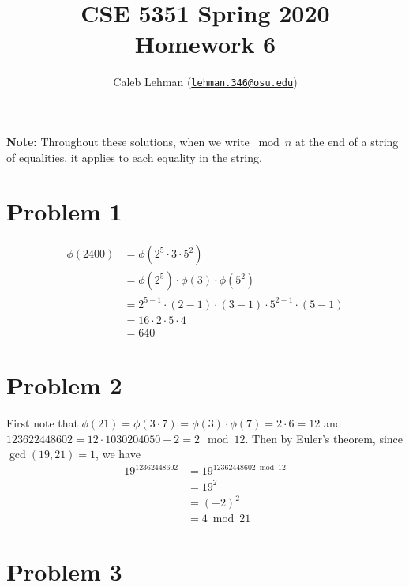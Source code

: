 \documentclass[12pt]{article}
\title{%
CSE 5351 Spring 2020\\
Homework 6
}
\author{%
Caleb Lehman
(\href{mailto:lehman.346@osu.edu}{\texttt{lehman.346@osu.edu}})
}
\date{%
}
\numberwithin{equation}{section}
\theoremstyle{plain}
\begin{document}
\maketitle

\textbf{Note:} Throughout these solutions, when we write $\bmod n$ at the end of a string of equalities,
it applies to each equality in the string.

\section*{Problem 1}

\begin{align*}
    \phi(2400)
        &= \phi(2^5 \cdot 3 \cdot 5^2) \\
        &= \phi(2^5) \cdot \phi(3) \cdot \phi(5^2) \\
        &= 2^{5-1} \cdot (2 - 1) \cdot (3 - 1) \cdot 5^{2-1} \cdot (5 - 1) \\
        &= 16 \cdot 2 \cdot 5 \cdot 4 \\
        &= 640
\end{align*}

\section*{Problem 2}

First note that $\phi(21) = \phi(3 \cdot 7) = \phi(3) \cdot \phi(7) = 2 \cdot 6 = 12$
and $123622448602 = 12 \cdot 1030204050 + 2 = 2 \mod 12$.
Then by Euler's theorem, since $\gcd(19, 21) = 1$, we have
\begin{align*}
    19^{12362448602}
        &= 19^{12362448602 \bmod 12} \\
        &= 19^2 \\
        &= (-2)^2 \\
        &= 4 \bmod 21
\end{align*}

\newpage
\section*{Problem 3}
\end{document}
